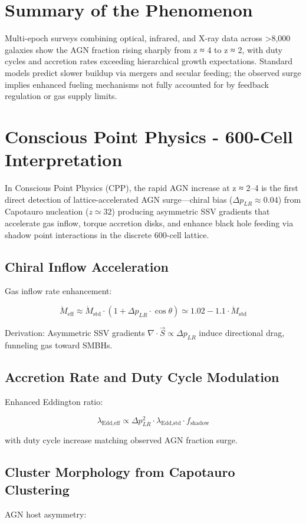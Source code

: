 \documentclass[11pt]{article}
\begin{document}
\section{Summary of the Phenomenon}
Multi-epoch surveys combining optical, infrared, and X-ray data across >8,000 galaxies show the AGN fraction rising sharply from z ≈ 4 to z ≈ 2, with duty cycles and accretion rates exceeding hierarchical growth expectations. Standard models predict slower buildup via mergers and secular feeding; the observed surge implies enhanced fueling mechanisms not fully accounted for by feedback regulation or gas supply limits.

\section{Conscious Point Physics - 600-Cell Interpretation}
In Conscious Point Physics (CPP), the rapid AGN increase at z ≈ 2–4 is the first direct detection of lattice-accelerated AGN surge—chiral bias ($\Delta p_{LR} \approx 0.04$) from Capotauro nucleation ($z \simeq 32$) producing asymmetric SSV gradients that accelerate gas inflow, torque accretion disks, and enhance black hole feeding via shadow point interactions in the discrete 600-cell lattice.

\subsection{Chiral Inflow Acceleration}
Gas inflow rate enhancement:

\[
\dot{M}_{\text{eff}} \approx \dot{M}_{\text{std}} \cdot (1 + \Delta p_{LR} \cdot \cos\theta) \simeq 1.02 - 1.1 \cdot \dot{M}_{\text{std}}
\]

Derivation: Asymmetric SSV gradients $\nabla \cdot \vec{S} \propto \Delta p_{LR}$ induce directional drag, funneling gas toward SMBHs.

\subsection{Accretion Rate and Duty Cycle Modulation}
Enhanced Eddington ratio:

\[
\lambda_{\text{Edd,eff}} \propto \Delta p_{LR}^2 \cdot \lambda_{\text{Edd,std}} \cdot f_{\text{shadow}}
\]

with duty cycle increase matching observed AGN fraction surge.

\subsection{Cluster Morphology from Capotauro Clustering}
AGN host asymmetry:
\end{document}
